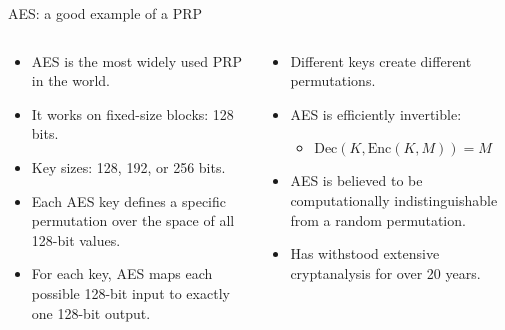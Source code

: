 \documentclass[aspectratio=169, lualatex, handout]{beamer}
\begin{document}
\begin{frame}{AES: a good example of a PRP}
	\begin{columns}[c]
		\begin{column}{0.5\textwidth}
			\begin{itemize}
				\item AES is the most widely used PRP in the world.
				\item It works on fixed-size blocks: 128 bits.
				\item Key sizes: 128, 192, or 256 bits.
				\item Each AES key defines a specific permutation over the space of all 128-bit values.
				\item For each key, AES maps each possible 128-bit input to exactly one 128-bit output.
			\end{itemize}
		\end{column}
		\begin{column}{0.5\textwidth}
			\begin{itemize}
				\item Different keys create different permutations.
				\item AES is efficiently invertible:
				      \begin{itemize}
					      \item $\text{Dec}(K, \text{Enc}(K, M)) = M$
				      \end{itemize}
				\item AES is believed to be computationally indistinguishable from a random permutation.
				\item Has withstood extensive cryptanalysis for over 20 years.
			\end{itemize}
		\end{column}
	\end{columns}
\end{frame}
\end{document}
